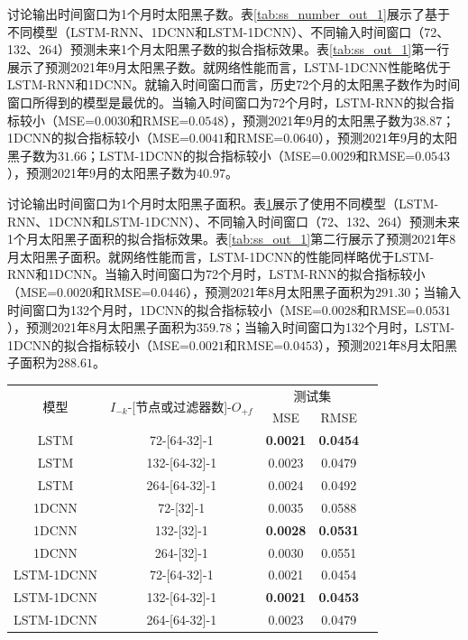 讨论输出时间窗口为1个月时太阳黑子数。表\ref{tab:ss_number_out_1}展示了基于不同模型（LSTM-RNN、1DCNN和LSTM-1DCNN）、不同输入时间窗口（72、132、264）预测未来1个月太阳黑子数的拟合指标效果。表\ref{tab:ss_out_1}第一行展示了预测2021年9月太阳黑子数。就网络性能而言，LSTM-1DCNN性能略优于LSTM-RNN和1DCNN。就输入时间窗口而言，历史72个月的太阳黑子数作为时间窗口所得到的模型是最优的。当输入时间窗口为72个月时，LSTM-RNN的拟合指标较小（MSE=$0.0030$和RMSE=$0.0548$），预测2021年9月的太阳黑子数为$38.87$；1DCNN的拟合指标较小（MSE=$0.0041$和RMSE=$0.0640$），预测2021年9月的太阳黑子数为$31.66$；LSTM-1DCNN的拟合指标较小（MSE=$0.0029$和RMSE=$0.0543$），预测2021年9月的太阳黑子数为$40.97$。

讨论输出时间窗口为1个月时太阳黑子面积。表\ref{tab:ss_area_out_1}展示了使用不同模型（LSTM-RNN、1DCNN和LSTM-1DCNN）、不同输入时间窗口（72、132、264）预测未来1个月太阳黑子面积的拟合指标效果。表\ref{tab:ss_out_1}第二行展示了预测2021年8月太阳黑子面积。就网络性能而言，LSTM-1DCNN的性能同样略优于LSTM-RNN和1DCNN。当输入时间窗口为72个月时，LSTM-RNN的拟合指标较小（MSE=$0.0020$和RMSE=$0.0446$），预测2021年8月太阳黑子面积为$291.30$；当输入时间窗口为132个月时，1DCNN的拟合指标较小（MSE=$0.0028$和RMSE=$0.0531$），预测2021年8月太阳黑子面积为$359.78$；当输入时间窗口为132个月时，LSTM-1DCNN的拟合指标较小（MSE=$0.0021$和RMSE=$0.0453$），预测2021年8月太阳黑子面积为$288.61$。

\begin{table}[!htbp]
  \centering
  \label{tab:ss_area_out_1}
  \footnotesize
  \renewcommand{\arraystretch}{1}
  \begin{tabular}{ccccc}
    \toprule
    \multirow{2}{*}{模型} & \multirow{2}{*}{$I_{-k}$-[节点或过滤器数]-$O_{+f}$} & \multicolumn{2}{c}{测试集}\\
    \cmidrule(lr){3-4}
    \noalign{\smallskip}
    & & MSE & RMSE\\
    \midrule 
    LSTM & 72-[64-32]-1 & \textbf{0.0021} & \textbf{0.0454} \\
    LSTM & 132-[64-32]-1 & 0.0023 & 0.0479 \\
    LSTM & 264-[64-32]-1 & 0.0024 & 0.0492 \\
    \hline
    1DCNN & 72-[32]-1 & 0.0035 & 0.0588 \\
    1DCNN & 132-[32]-1 & \textbf{0.0028} & \textbf{0.0531} \\
    1DCNN & 264-[32]-1 & 0.0030 & 0.0551 \\
    \hline
    LSTM-1DCNN & 72-[64-32]-1 & 0.0021 & 0.0454 \\
    LSTM-1DCNN & 132-[64-32]-1 & \textbf{0.0021} & \textbf{0.0453} \\
    LSTM-1DCNN & 264-[64-32]-1 & 0.0023 & 0.0479 \\
    \bottomrule
\end{tabular}
\end{table}

